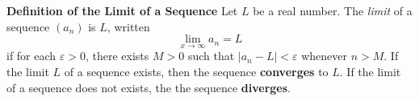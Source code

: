 \nopagenumbers
{\bf Definition of the Limit of a Sequence}
\vskip 6pt
Let $L$ be a real number. The {\it limit} of a sequence $(a_n)$ is $L$, written $$\lim_{x\to\infty}a_n=L$$ if for each $\varepsilon >0$, there exists $M>0$ such that $|a_n-L|<\varepsilon$ whenever $n>M$. If the limit $L$ of a sequence exists, then the sequence {\bf converges} to $L$. If the limit of a sequence does not exists, the the sequence {\bf diverges}.
\vfill\eject
